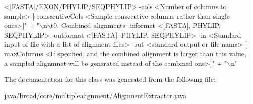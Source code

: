 \begin{DoxyCode}
{       <[FASTA]/EXON/PHYLIP/SEQPHYLIP> -cols <Number of columns to sample> [-consecutiveCols <Sample consecutive columns rather than
       single ones>]"} +
    \textcolor{stringliteral}{"\(\backslash\)n\(\backslash\)t9. Combined alignments -informat <[FASTA], PHYLIP, SEQPHYLIP> -outformat <[FASTA], PHYLIP,
       SEQPHYLIP> -in <Standard input of file with a list of alignment files> -out <standard output or file name>
       [-maxColumns <If specified, and the combined alignment is larger than this value, a sampled alignmnet will be
       generated instead of the combined one>]"} +
    \textcolor{stringliteral}{"\(\backslash\)n"}
\end{DoxyCode}


The documentation for this class was generated from the following file\+:\begin{DoxyCompactItemize}
\item 
java/broad/core/multiplealignment/\hyperlink{_alignment_extractor_8java}{Alignment\+Extractor.\+java}\end{DoxyCompactItemize}
